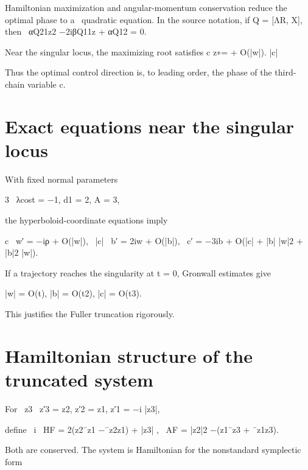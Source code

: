 \begin{displaytext}
Hamiltonian maximization and angular-momentum conservation reduce the optimal phase to a \
quadratic equation. In the source notation, if Q = [ΛR, X], then \
αQ21z2 −2iβQ11z + αQ12 = 0.
\end{displaytext}

Near the singular locus, the maximizing root satisfies c z∗= + O(|w|). |c|


Thus the optimal control direction is, to leading order, the phase of the third-chain variable c.


\section{Exact equations near the singular locus}

With fixed normal parameters


\begin{displaytext}
3 \
λcost = −1, d1 = 2, A = 3,
\end{displaytext}

the hyperboloid-coordinate equations imply


\begin{displaytext}
c \
w′ = −iρ + O(|w|), \
|c| \
b′ = 2iw + O(|b|), \
c′ = −3ib + O(|c| + |b| |w|2 + |b|2 |w|).
\end{displaytext}

If a trajectory reaches the singularity at t = 0, Gronwall estimates give


\begin{displaytext}
|w| = O(t), |b| = O(t2), |c| = O(t3).
\end{displaytext}

This justifies the Fuller truncation rigorously.


\section{Hamiltonian structure of the truncated system}

\begin{displaytext}
For \
z3 \
z′3 = z2, z′2 = z1, z′1 = −i |z3|,
\end{displaytext}

\begin{displaytext}
define \
i \
HF = 2(z2¯z1 −¯z2z1) + |z3| , \
AF = |z2|2 −(z1¯z3 + ¯z1z3).
\end{displaytext}

Both are conserved. The system is Hamiltonian for the nonstandard symplectic form


